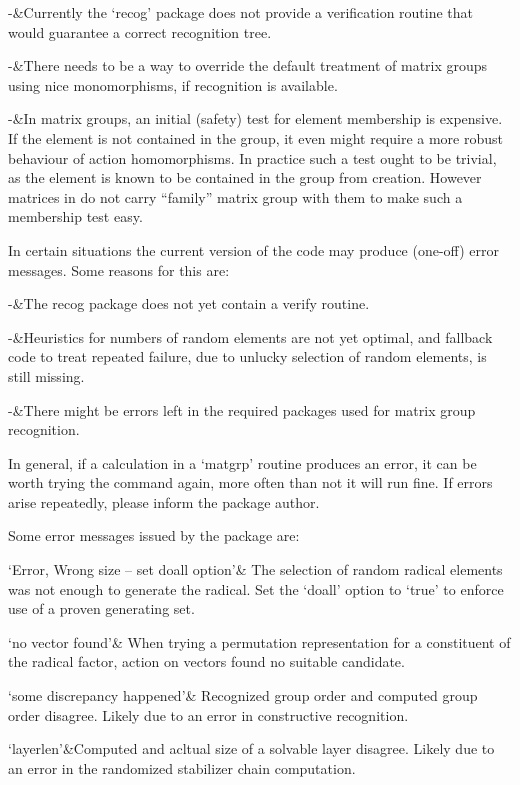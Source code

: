 \beginitems
-&Currently the `recog' package does not provide a verification routine that
would guarantee a correct recognition tree.

-&There needs to be a way to override the default treatment of matrix groups
using nice monomorphisms, if recognition is available.

-&In matrix groups, an initial (safety) test for element membership is
expensive. If the element is not contained in the group, it even might
require a more robust behaviour of action homomorphisms.
In practice such a test ought to be trivial, as the element is known to be
contained in the group from creation. However matrices in {\GAP} do not
carry ``family'' matrix group with them to make such a membership test easy.
\enditems


In certain situations the current version of the code may produce (one-off)
error messages. Some reasons for this are:

\beginitems
-&The recog package does not yet contain a verify routine.

-&Heuristics for numbers of random elements are not yet optimal, and
  fallback code to treat repeated failure, due to unlucky selection of random
elements, is still missing.

-&There might be errors left in the required packages used for matrix group
  recognition.
\enditems

In general, if a calculation in a `matgrp' routine produces an error, it can
be worth trying the command again, more often than not it will run fine. If
errors arise repeatedly, please inform the package author.

Some error messages issued by the package are:

\beginitems
`Error, Wrong size -- set doall option'&
The selection of random radical elements was not enough to generate the
radical. Set the `doall' option to `true' to enforce use of a proven
generating set.

`no vector found'&
When trying a permutation representation for a constituent of the radical
factor, action on vectors found no suitable candidate.

`some discrepancy happened'&
Recognized group order and computed group order disagree. Likely due to an
error in constructive recognition.

`layerlen'&Computed and acltual size of a solvable layer disagree. Likely
due to an error in the randomized stabilizer chain computation.
\enditems

